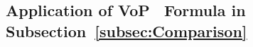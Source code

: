 \documentclass[usenames,dvipsnames,final,12pt]{colt2018} %
\newcommand{\vop}{VoP}
\newcommand{\et}{\epsilon_1}
\newcommand{\etg}{R_1^{\textrm{gap}}}
\newcommand{\Rti}{R_1^{\textrm{in}}}
\newcommand{\Kt}{K_1}
\newcommand{\Lt}[1]{L^{\theta}_{#1}}
\newcommand{\lz}{q_2}
\newcommand{\ez}{\epsilon_2}
\newcommand{\Rzi}{R_2^{\textrm{in}}}
\newcommand{\Lz}{L^z}
\newcommand{\Kz}{K_2}
\newcommand{\N}[1]{N_{0,#1}}
\newcommand{\n}[1]{N_{1,#1}}
\newcommand{\lm}{q}
\newcommand{\tI}[1]{t_{#1}}
\newcommand{\sI}[1]{s_{#1}}
\newcommand{\gal}[1]{#1}
\newcommand{\gugan}[1]{#1}
\begin{document}

%

\subsection{Application of \gugan{\vop\ } Formula in Subsection~\ref{subsec:Comparison}}
\label{sec:VoC}
\end{document}
